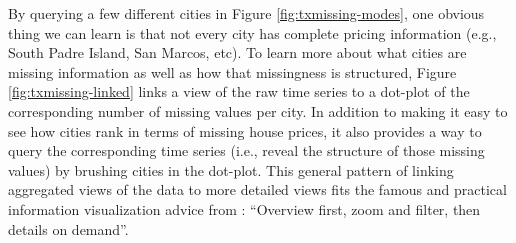 \documentclass[
  12pt,
]{krantz}
\newenvironment{Shaded}{\begin{snugshade}}{\end{snugshade}}
\newcommand{\CommentTok}[1]{\textcolor[rgb]{0.56,0.35,0.01}{\textit{#1}}}
\newcommand{\DataTypeTok}[1]{\textcolor[rgb]{0.13,0.29,0.53}{#1}}
\newcommand{\DecValTok}[1]{\textcolor[rgb]{0.00,0.00,0.81}{#1}}
\newcommand{\FloatTok}[1]{\textcolor[rgb]{0.00,0.00,0.81}{#1}}
\newcommand{\KeywordTok}[1]{\textcolor[rgb]{0.13,0.29,0.53}{\textbf{#1}}}
\newcommand{\NormalTok}[1]{#1}
\newcommand{\OperatorTok}[1]{\textcolor[rgb]{0.81,0.36,0.00}{\textbf{#1}}}
\newcommand{\OtherTok}[1]{\textcolor[rgb]{0.56,0.35,0.01}{#1}}
\newcommand{\StringTok}[1]{\textcolor[rgb]{0.31,0.60,0.02}{#1}}
\begin{document}
By querying a few different cities in Figure \ref{fig:txmissing-modes}, one obvious thing we can learn is that not every city has complete pricing information (e.g., South Padre Island, San Marcos, etc). To learn more about what cities are missing information as well as how that missingness is structured, Figure \ref{fig:txmissing-linked} links a view of the raw time series to a dot-plot of the corresponding number of missing values per city. In addition to making it easy to see how cities rank in terms of missing house prices, it also provides a way to query the corresponding time series (i.e., reveal the structure of those missing values) by brushing cities in the dot-plot. This general pattern of linking aggregated views of the data to more detailed views fits the famous and practical information visualization advice from \citet{details-on-demand}: ``Overview first, zoom and filter, then details on demand''.

\begin{Shaded}
\end{Shaded}
\end{document}
